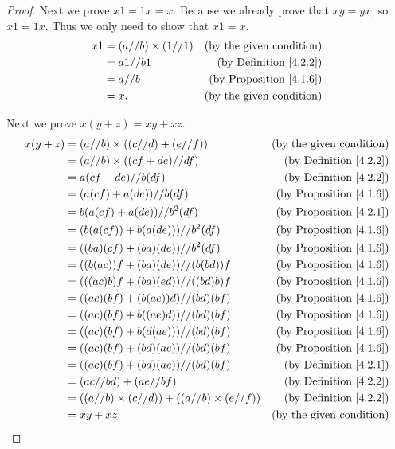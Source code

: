 \begin{proof}
Next we prove \(x1 = 1x = x\).
Because we already prove that \(xy = yx\), so \(x1 = 1x\).
Thus we only need to show that \(x1 = x\).
\begin{align*}
x1 &= (a // b) \times (1 // 1) & \text{(by the given condition)} \\
&= a1 // b1 & \text{(by Definition \ref{4.2.2})} \\
&= a // b & \text{(by Proposition \ref{4.1.6})} \\
&= x. & \text{(by the given condition)}
\end{align*}

Next we prove \(x(y + z) = xy + xz\).
\begin{align*}
x(y + z) &= (a // b) \times ((c // d) + (e // f)) & \text{(by the given condition)} \\
&= (a // b) \times ((cf + de) // df) & \text{(by Definition \ref{4.2.2})} \\
&= a(cf + de) // b(df) & \text{(by Definition \ref{4.2.2})} \\
&= (a(cf) + a(de)) // b(df) & \text{(by Proposition \ref{4.1.6})} \\
&= b(a(cf) + a(de)) // b^2(df) & \text{(by Proposition \ref{4.2.1})} \\
&= (b(a(cf)) + b(a(de))) // b^2(df) & \text{(by Proposition \ref{4.1.6})} \\
&= ((ba)(cf) + (ba)(de)) // b^2(df) & \text{(by Proposition \ref{4.1.6})} \\
&= ((b(ac))f + (ba)(de)) // (b(bd))f & \text{(by Proposition \ref{4.1.6})} \\
&= (((ac)b)f + (ba)(ed)) // ((bd)b)f & \text{(by Proposition \ref{4.1.6})} \\
&= ((ac)(bf) + (b(ae))d) // (bd)(bf) & \text{(by Proposition \ref{4.1.6})} \\
&= ((ac)(bf) + b((ae)d)) // (bd)(bf) & \text{(by Proposition \ref{4.1.6})} \\
&= ((ac)(bf) + b(d(ae))) // (bd)(bf) & \text{(by Proposition \ref{4.1.6})} \\
&= ((ac)(bf) + (bd)(ae)) // (bd)(bf) & \text{(by Proposition \ref{4.1.6})} \\
&= ((ac)(bf) + (bd)(ae)) // (bd)(bf) & \text{(by Definition \ref{4.2.1})} \\
&= (ac // bd) + (ae // bf) & \text{(by Definition \ref{4.2.2})} \\
&= ((a // b) \times (c // d)) + ((a // b) \times (e // f)) & \text{(by Definition \ref{4.2.2})} \\
&= xy + xz. & \text{(by the given condition)}
\end{align*}


\end{proof}
